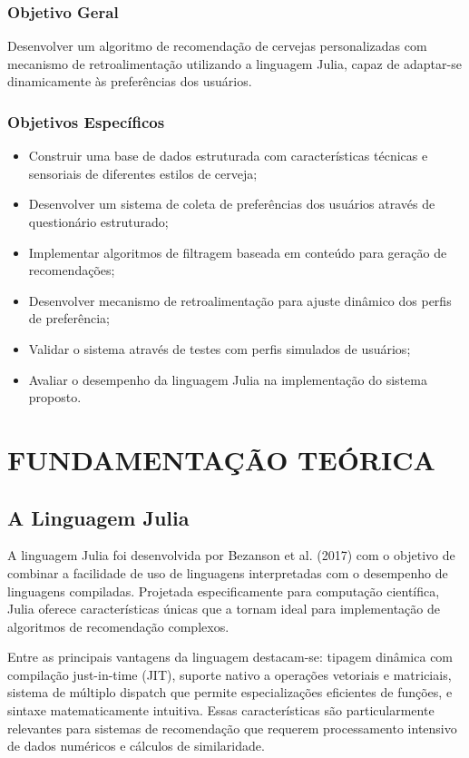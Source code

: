 \documentclass[12pt,a4paper]{article}
\begin{document}
\subsubsection{Objetivo Geral}

Desenvolver um algoritmo de recomendação de cervejas personalizadas com mecanismo de retroalimentação utilizando a linguagem Julia, capaz de adaptar-se dinamicamente às preferências dos usuários.

\subsubsection{Objetivos Específicos}

\begin{itemize}
\item Construir uma base de dados estruturada com características técnicas e sensoriais de diferentes estilos de cerveja;
\item Desenvolver um sistema de coleta de preferências dos usuários através de questionário estruturado;
\item Implementar algoritmos de filtragem baseada em conteúdo para geração de recomendações;
\item Desenvolver mecanismo de retroalimentação para ajuste dinâmico dos perfis de preferência;
\item Validar o sistema através de testes com perfis simulados de usuários;
\item Avaliar o desempenho da linguagem Julia na implementação do sistema proposto.
\end{itemize}

\newpage
\section{FUNDAMENTAÇÃO TEÓRICA}

\subsection{A Linguagem Julia}

A linguagem Julia foi desenvolvida por Bezanson et al. (2017) com o objetivo de combinar a facilidade de uso de linguagens interpretadas com o desempenho de linguagens compiladas. Projetada especificamente para computação científica, Julia oferece características únicas que a tornam ideal para implementação de algoritmos de recomendação complexos.

Entre as principais vantagens da linguagem destacam-se: tipagem dinâmica com compilação just-in-time (JIT), suporte nativo a operações vetoriais e matriciais, sistema de múltiplo dispatch que permite especializações eficientes de funções, e sintaxe matematicamente intuitiva. Essas características são particularmente relevantes para sistemas de recomendação que requerem processamento intensivo de dados numéricos e cálculos de similaridade.
\end{document}
